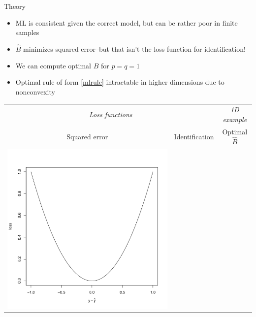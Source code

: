 \documentclass[final]{beamer}
\newlength{\onecolwid}
\begin{document}
\begin{frame}[t]
\begin{columns}[t]
\begin{column}{\onecolwid}
\begin{block}{Theory}
\begin{itemize}
\item ML is consistent given the correct model, but can be rather poor in finite samples
\item $\hat{B}$ minimizes squared error--but that isn't the loss function for identification!
\item We can compute optimal $\hat{B}$ for $p = q = 1$
\item Optimal rule of form \eqref{mlrule} intractable in higher dimensions due to nonconvexity
\end{itemize}
\begin{center}
\begin{tabular}{cc|c}
\multicolumn{2}{c}{\emph{Loss functions}} & {\emph{1D example}}\\
{\small Squared error} & {\small Identification} & {\small Optimal $\hat{B}$}\\
\includegraphics[scale = 0.6, trim = 1in 1in 0.5in 1in, clip]{loss_se.pdf} & 

\end{tabular}
\end{center}
\end{block}
\end{column}
\end{columns}
\end{frame}
\end{document}
